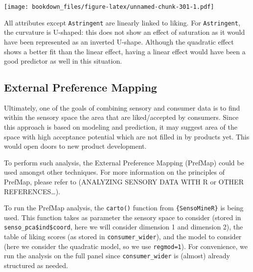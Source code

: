 \documentclass[
]{krantz}
\makeatletter
\newenvironment{Shaded}{\begin{snugshade}}{\end{snugshade}}
\newcommand{\AttributeTok}[1]{\textcolor[rgb]{0.61,0.61,0.61}{#1}}
\newcommand{\ConstantTok}[1]{\textcolor[rgb]{0,0,0}{#1}}
\newcommand{\ControlFlowTok}[1]{\textcolor[rgb]{0.27,0.27,0.27}{\textbf{#1}}}
\newcommand{\FunctionTok}[1]{\textcolor[rgb]{0,0,0}{#1}}
\newcommand{\NormalTok}[1]{#1}
\newcommand{\OtherTok}[1]{\textcolor[rgb]{0.37,0.37,0.37}{#1}}
\newcommand{\SpecialCharTok}[1]{\textcolor[rgb]{0,0,0}{#1}}
\newenvironment{kframe}{%
\medskip{}
\setlength{\fboxsep}{.8em}
 \def\at@end@of@kframe{}%
 \ifinner\ifhmode%
  \def\at@end@of@kframe{\end{minipage}}%
  \begin{minipage}{\columnwidth}%
 \fi\fi%
 \def\FrameCommand##1{\hskip\@totalleftmargin \hskip-\fboxsep
 \colorbox{shadecolor}{##1}\hskip-\fboxsep
     \hskip-\linewidth \hskip-\@totalleftmargin \hskip\columnwidth}%
 \MakeFramed {\advance\hsize-\width
   \@totalleftmargin\z@ \linewidth\hsize
   \@setminipage}}%
 {\par\unskip\endMakeFramed%
 \at@end@of@kframe}
\renewenvironment{Shaded}{\begin{kframe}}{\end{kframe}}
\makeatother
\begin{document}
\begin{Shaded}
\end{Shaded}

\texttt{[image: bookdown\_files/figure-latex/unnamed-chunk-301-1.pdf]}

All attributes except \texttt{Astringent} are linearly linked to liking. For \texttt{Astringent}, the curvature is U-shaped: this does not show an effect of saturation as it would have been represented as an inverted U-shape. Although the quadratic effect shows a better fit than the linear effect, having a linear effect would have been a good predictor as well in this situation.

\hypertarget{prefmap}{%
\subsection{External Preference Mapping}\label{prefmap}}

Ultimately, one of the goals of combining sensory and consumer data is to find within the sensory space the area that are liked/accepted by consumers. Since this approach is based on modeling and prediction, it may suggest area of the space with high acceptance potential which are not filled in by products yet. This would open doors to new product development.

To perform such analysis, the External Preference Mapping (PrefMap) could be used amongst other techniques. For more information on the principles of PrefMap, please refer to (ANALYZING SENSORY DATA WITH R or OTHER REFERENCES\ldots).

To run the PrefMap analysis, the \texttt{carto()} function from \texttt{\{SensoMineR\}} is being used. This function takes as parameter the sensory space to consider (stored in \texttt{senso\_pca\$ind\$coord}, here we will consider dimension 1 and dimension 2), the table of liking scores (as stored in \texttt{consumer\_wider}), and the model to consider (here we consider the quadratic model, so we use \texttt{regmod=1}). For convenience, we run the analysis on the full panel since \texttt{consumer\_wider} is (almost) already structured as needed.
\end{document}
